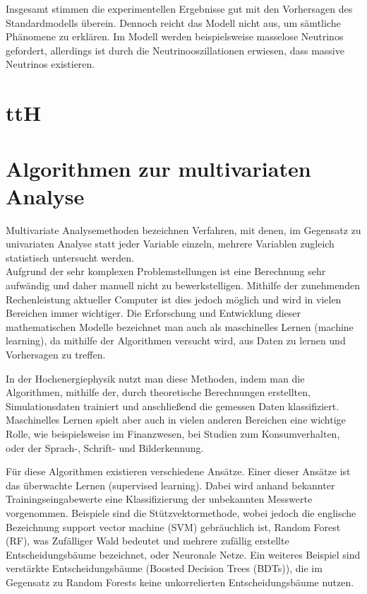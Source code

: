 Insgesamt stimmen die experimentellen Ergebnisse gut mit den Vorhersagen des Standardmodells \"uberein. Dennoch reicht das Modell nicht aus, um s\"amtliche Ph\"anomene zu erkl\"aren. Im Modell werden beispielsweise masselose Neutrinos gefordert, allerdings ist durch die Neutrinooszillationen erwiesen, dass massive Neutrinos existieren.

\section{ttH}
\label{ch:Theorie:subsec:ttH}

\section{Algorithmen zur multivariaten Analyse}
\label{ch:Theorie:sec:Algorithmen}

Multivariate Analysemethoden bezeichnen Verfahren, mit denen, im Gegensatz zu univariaten Analyse statt jeder Variable einzeln, mehrere Variablen zugleich statistisch untersucht werden.\\
Aufgrund der sehr komplexen Problemstellungen ist eine Berechnung sehr aufw\"andig und daher manuell nicht zu bewerkstelligen. Mithilfe der zunehmenden Rechenleistung aktueller Computer ist dies jedoch m\"oglich und wird in vielen Bereichen immer wichtiger. Die Erforschung und Entwicklung dieser mathematischen Modelle bezeichnet man auch als maschinelles Lernen (machine learning), da mithilfe der Algorithmen versucht wird, aus Daten zu lernen und Vorhersagen zu treffen. \cite{SWB-455193959}

In der Hochenergiephysik nutzt man diese Methoden, indem man die Algorithmen, mithilfe der, durch theoretische Berechnungen erstellten, Simulationsdaten trainiert und anschlie\ss end die gemessen Daten klassifiziert.\\ 
Maschinelles Lernen spielt aber auch in vielen anderen Bereichen eine wichtige Rolle, wie beispielsweise im Finanzwesen, bei Studien zum Konsumverhalten, oder der Sprach-, Schrift- und Bilderkennung.

F\"ur diese Algorithmen existieren verschiedene Ans\"atze. Einer dieser Ans\"atze ist das \"uberwachte Lernen (supervised learning). Dabei wird anhand bekannter Trainingseingabewerte eine Klassifizierung der unbekannten Messwerte vorgenommen. Beispiele sind die St\"utzvektormethode, wobei jedoch die englische Bezeichnung support vector machine (SVM) gebr\"auchlich ist, Random Forest (RF), was Zuf\"alliger Wald bedeutet und mehrere zuf\"allig erstellte Entscheidungsb\"aume bezeichnet, oder Neuronale Netze. Ein weiteres Beispiel sind verst\"arkte Entscheidungsb\"aume (Boosted Decision Trees (BDTs)), die im Gegensatz zu Random Forests keine unkorrelierten Entscheidungsb\"aume nutzen.


